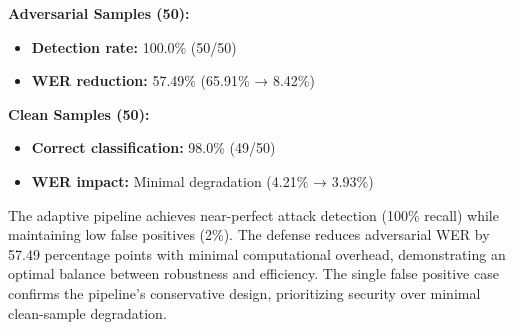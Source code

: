 \documentclass[../main.tex]{subfiles}
\begin{document}
\noindent\textbf{Adversarial Samples (50):}
\begin{itemize}
    \item \textbf{Detection rate:} 100.0\% (50/50)
    \item \textbf{WER reduction:} 57.49\% (65.91\% → 8.42\%)
\end{itemize}

\noindent\textbf{Clean Samples (50):}
\begin{itemize}
    \item \textbf{Correct classification:} 98.0\% (49/50)
    \item \textbf{WER impact:} Minimal degradation (4.21\% → 3.93\%)
\end{itemize}

The adaptive pipeline achieves near-perfect attack detection (100\% recall) while maintaining low false positives (2\%). The defense reduces adversarial WER by 57.49 percentage points with minimal computational overhead, demonstrating an optimal balance between robustness and efficiency. The single false positive case confirms the pipeline's conservative design, prioritizing security over minimal clean-sample degradation.


\ifSubfilesClassLoaded{
  
  
}{}
\end{document}
